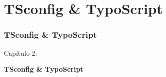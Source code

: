 %

\section{TSconfig \& TypoScript}
\begin{frame}[fragile]
	\frametitle{TSconfig \& TypoScript}

	\begin{center}\huge{Capítulo 2:}\end{center}
	\begin{center}\huge{\color{typo3darkgrey}\textbf{TSconfig \& TypoScript}}\end{center}

\end{frame}

